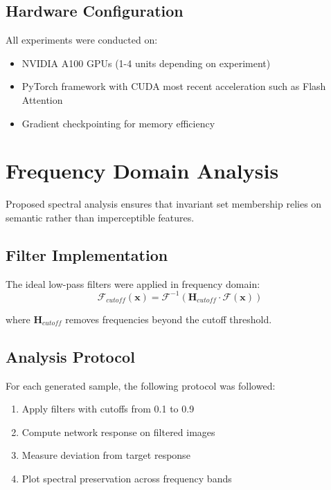 \subsection{Hardware Configuration}

All experiments were conducted on:
\begin{itemize}
\item NVIDIA A100 GPUs (1-4 units depending on experiment)
\item PyTorch framework with CUDA most recent  acceleration such as Flash Attention \citep{dao2022flashattention, dao2023flashattention2}
\item Gradient checkpointing for memory efficiency
\end{itemize}

\section{Frequency Domain Analysis}\label{appendix:frequency_analysis}

Proposed spectral analysis ensures that invariant set membership relies on semantic rather than imperceptible features.

\subsection{Filter Implementation}

The ideal low-pass filters were applied in frequency domain:
\begin{equation}
\mathcal{F}_{cutoff}(\mathbf{x}) = \mathcal{F}^{-1}(\mathbf{H}_{cutoff} \cdot \mathcal{F}(\mathbf{x}))
\end{equation}

where $\mathbf{H}_{cutoff}$ removes frequencies beyond the cutoff threshold.

\subsection{Analysis Protocol}

For each generated sample, the following protocol was followed:
\begin{enumerate}
\item Apply filters with cutoffs from 0.1 to 0.9
\item Compute network response on filtered images
\item Measure deviation from target response
\item Plot spectral preservation across frequency bands
\end{enumerate}

